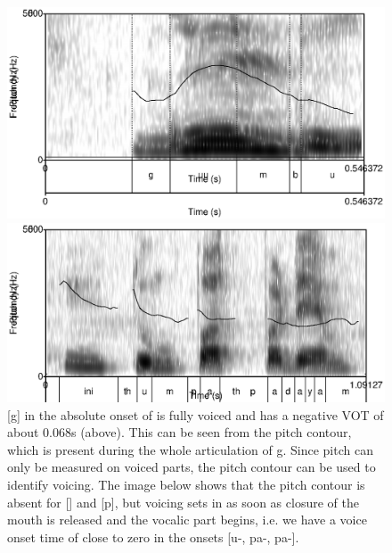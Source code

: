 \label{sec:VOT}
\begin{figure}
 \centering
 \includegraphics[height=0.3\textheight]{./pics/guumbu-a.eps}

 \includegraphics[height=0.3\textheight]{./pics/inithumpathpadayam.eps}

 \caption{[g] in the absolute onset of  is fully voiced and has a negative VOT of about 0.068s (above). This can be seen from the pitch contour, which is present during the whole articulation of g. Since pitch can only be measured on voiced parts, the pitch contour can be used to identify voicing. The image below shows that the pitch contour is absent for  [\dentt] and [p], but voicing sets in as soon as closure of the mouth is released and the vocalic part begins, i.e. we  have a voice onset time of close to zero in the onsets [\dentt u-, pa-, pa-].}
 \label{fig:phon:vot:inithumpathpadayam}
\end{figure}

